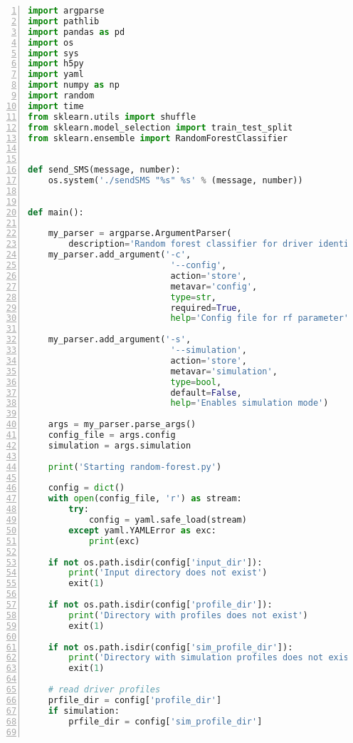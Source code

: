 \begin{lstlisting}[frame=lines, caption=Ausschnitt Fahreridentifikation, captionpos=b, label = lst:a_sw_rf, numbers=left, language=Python, showstringspaces=false, basicstyle=\footnotesize]
import argparse
import pathlib
import pandas as pd
import os
import sys
import h5py
import yaml
import numpy as np
import random
import time
from sklearn.utils import shuffle
from sklearn.model_selection import train_test_split
from sklearn.ensemble import RandomForestClassifier


def send_SMS(message, number):
    os.system('./sendSMS "%s" %s' % (message, number))


def main():

    my_parser = argparse.ArgumentParser(
        description='Random forest classifier for driver identification')
    my_parser.add_argument('-c',
                            '--config',
                            action='store',
                            metavar='config',
                            type=str,
                            required=True,
                            help='Config file for rf parameter')

    my_parser.add_argument('-s',
                            '--simulation',
                            action='store',
                            metavar='simulation',
                            type=bool,
                            default=False,
                            help='Enables simulation mode')

    args = my_parser.parse_args()
    config_file = args.config
    simulation = args.simulation

    print('Starting random-forest.py')

    config = dict()
    with open(config_file, 'r') as stream:
        try:
            config = yaml.safe_load(stream)
        except yaml.YAMLError as exc:
            print(exc)

    if not os.path.isdir(config['input_dir']):
        print('Input directory does not exist')
        exit(1)

    if not os.path.isdir(config['profile_dir']):
        print('Directory with profiles does not exist')
        exit(1)

    if not os.path.isdir(config['sim_profile_dir']):
        print('Directory with simulation profiles does not exist')
        exit(1)

    # read driver profiles
    prfile_dir = config['profile_dir']
    if simulation:
        prfile_dir = config['sim_profile_dir']


\end{lstlisting}

